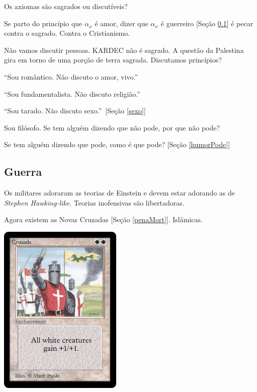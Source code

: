 \documentclass[12pt,a4paper]{article}
\begin{document}
			Os axiomas s\~ao sagrados ou discut\'iveis?

			Se parto do princ\'ipio que $ \alpha_\omega $ \'e amor, dizer que $ \alpha_\omega $ \'e guerreiro [Se\c{c}\~ao \ref{guerra}] \'e pecar contra o sagrado. Contra o Cristianismo.

			N\~ao vamos discutir pessoas. KARDEC n\~ao \'e sagrado. A quest\~ao da Palestina gira em torno de uma por\c{c}\~ao de terra sagrada. Discutamos princ\'ipios?

			\textquotedblleft Sou rom\^antico. N\~ao discuto o amor, vivo.\textquotedblright

			\textquotedblleft Sou fundamentalista. N\~ao discuto religi\~ao.\textquotedblright

			\textquotedblleft Sou tarado. N\~ao discuto sexo.\textquotedblright\, [Se\c{c}\~ao \ref{sexo}]

			Sou fil\'osofo\cite{x}. Se tem algu\'em dizendo que n\~ao pode, por que n\~ao pode?

			Se tem algu\'em dizendo que pode, como \'e que pode? [Se\c{c}\~ao \ref{humorPode}]

		\subsection{Guerra}\label{guerra}
			\begin{flushright}
			\end{flushright}

			Os militares adoraram as teorias de Einstein e devem estar adorando as de \emph{Stephen Hawking-like}. Teorias inofensivas s\~ao libertadoras.

			Agora existem as Novas Cruzadas [Se\c{c}\~ao \ref{penaMort}]. Isl\^amicas.

			\begin{center}
			\includegraphics{crusade}
			\end{center}
\end{document}
